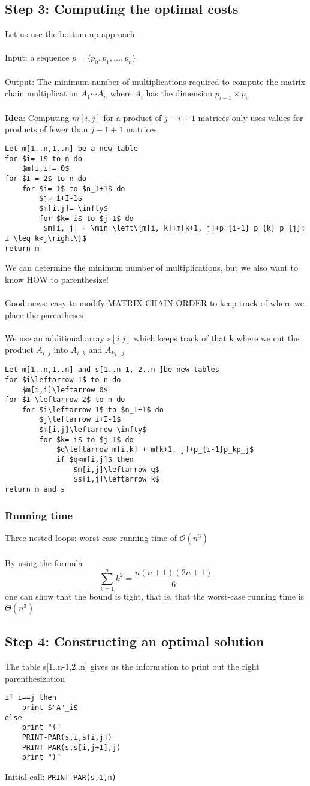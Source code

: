 \documentclass{article}[18pt]
\begin{document}
\subsection{Step 3: Computing the optimal costs}
Let us use the bottom-up approach\\
\\
Input: a sequence $p=\langle p_0,p_1,...,p_n\rangle$\\
\\
Output: The minimum number of multiplications required to compute the matrix chain multiplication $A_1\cdots A_n$ where $A_i$ has the dimension $p_{i-1}\times p_i$\\
\\
\textbf{Idea}: Computing $m[i,j]$ for a product of $j-i+1$ matrices only uses values for products of fewer than $j-1+1$ matrices
\begin{lstlisting}[caption=MATRIX-CHAIN-ORDER(p)]
Let m[1..n,1..n] be a new table
for $i= 1$ to n do
	$m[i,i]= 0$
for $I = 2$ to n do
	for $i= 1$ to $n_I+1$ do
		$j= i+I-1$
		$m[i.j]= \infty$
		for $k= i$ to $j-1$ do
		 $m[i, j] = \min \left\{m[i, k]+m[k+1, j]+p_{i-1} p_{k} p_{j}: i \leq k<j\right\}$
return m
\end{lstlisting}
We can determine the minimum number of multiplications, but we also want to know HOW to parenthesize!\\
\\
Good news: easy to modify MATRIX-CHAIN-ORDER to keep track of where we place the parentheses\\
\\
We use an additional array $s[i.j]$ which keeps track of that k where we cut the product $A_{i..j}$ into $A_{i..k}$ and $A_{k_1...j}$
\begin{lstlisting}[caption=MATRIX-CHAIN-ORDER'(p)]
Let m[1..n,1..n] and s[1..n-1, 2..n ]be new tables
for $i\leftarrow 1$ to n do
	$m[i,i]\leftarrow 0$
for $I \leftarrow 2$ to n do
	for $i\leftarrow 1$ to $n_I+1$ do
		$j\leftarrow i+I-1$
		$m[i.j]\leftarrow \infty$
		for $k= i$ to $j-1$ do
			$q\leftarrow m[i,k] + m[k+1, j]+p_{i-1}p_kp_j$
			if $q<m[i,j]$ then
				$m[i,j]\leftarrow q$
				$s[i,j]\leftarrow k$
return m and s
\end{lstlisting}
\subsubsection{Running time}
Three nested loops: worst case running time of $\mathcal{O}(n^3)$\\
\\
By using the formula
$$\sum_{k=1}^{n}k^2=\dfrac{n(n+1)(2n+1)}{6}$$
one can show that the bound is tight, that is, that the worst-case running time is $\Theta(n^3)$
\subsection{Step 4: Constructing an optimal solution}
The table s[1..n-1,2..n] gives us the information to print out the right parenthesization
\begin{lstlisting}[caption=PRINT-PAR({s,i,j})]
if i==j then
	print $"A"_i$
else
	print "("
	PRINT-PAR(s,i,s[i,j])
	PRINT-PAR(s,s[i,j+1],j)
	print ")"
\end{lstlisting}
Initial call: \texttt{PRINT-PAR(s,1,n)}
\end{document}
